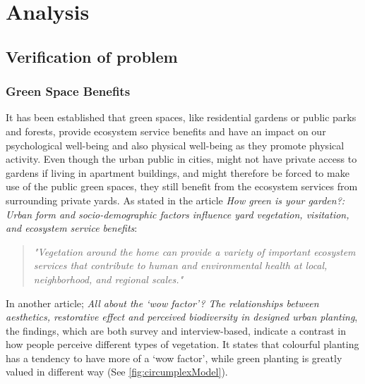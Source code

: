 \chapter{Analysis}
	
		
	\section{Verification of problem}\label{sec:verification}
		
 	\subsection{Green Space Benefits}
	It has been established that green spaces, like residential gardens or public parks and forests, provide ecosystem service benefits and have an impact on our psychological well-being and also physical well-being as they promote physical activity\cite{urbanGreenSpace}\cite{healthBenefitsNature}. Even though the urban public in cities, might not have private access to gardens if living in apartment buildings, and might therefore be forced to make use of the public green spaces, they still benefit from the ecosystem services from surrounding private yards\cite{greenSpaceBenefits}. As stated in the article \textit{How green is your garden?: Urban form and socio-demographic factors influence yard vegetation, visitation, and ecosystem service benefits}:\\
	
	\begin{quote}
		\textit{"Vegetation around the home can provide a variety of important ecosystem services that contribute to human and environmental health at local, neighborhood, and regional scales\label{articleQuote}."}\\
	\end{quote}
	
	In another article; \textit{All about the ‘wow factor’? The relationships between aesthetics, restorative effect and perceived biodiversity in designed urban planting}\cite{wowFactor}, the findings, which are both survey and interview-based, indicate a contrast in how people perceive different types of vegetation. It states that colourful planting has a tendency to have more of a ‘wow factor’, while green planting is greatly valued in different way (See \autoref{fig:circumplexModel}).
	
